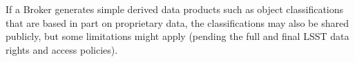 If a Broker generates simple derived data products such as object classifications that are based in part on proprietary data, the classifications may also be shared publicly, but some limitations might apply (pending the full and final LSST data rights and access policies).




